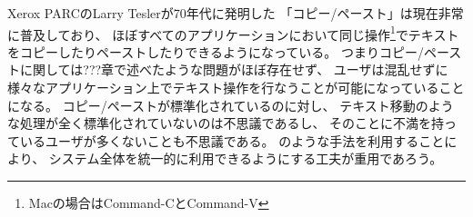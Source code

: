 Xerox PARCのLarry Teslerが70年代に発明した\cite{Tesler:CopyPaste}
「コピー/ペースト」は現在非常に普及しており、
ほぼすべてのアプリケーションにおいて同じ操作\footnote{
  Macの場合はCommand-CとCommand-V
}でテキストをコピーしたりペーストしたりできるようになっている。
つまりコピー/ペーストに関しては???章で述べたような問題がほぼ存在せず、
ユーザは混乱せずに様々なアプリケーション上でテキスト操作を行なうことが可能になっていることになる。
コピー/ペーストが標準化されているのに対し、
テキスト移動のような処理が全く標準化されていないのは不思議であるし、
そのことに不満を持っているユーザが多くないことも不思議である。
{\system}のような手法を利用することにより、
システム全体を統一的に利用できるようにする工夫が重用であろう。



